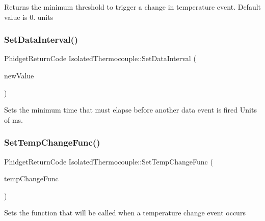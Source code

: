 Returns the minimum threshold to trigger a change in temperature event. Default value is 0. units\mbox{\label{classIsolatedThermocouple_a7d4ff9c47960781140634cb8eeac1258}} 
\subsubsection{\texorpdfstring{Set\+Data\+Interval()}{SetDataInterval()}}
{\footnotesize\ttfamily Phidget\+Return\+Code Isolated\+Thermocouple\+::\+Set\+Data\+Interval (\begin{DoxyParamCaption}\item[{uint32\+\_\+t}]{new\+Value }\end{DoxyParamCaption})\hspace{0.3cm}{\ttfamily [inline]}}

Sets the minimum time that must elapse before another data event is fired Units of ms.\mbox{\label{classIsolatedThermocouple_a1aad9e7c6c473de87a636bff910283c6}} 
\subsubsection{\texorpdfstring{Set\+Temp\+Change\+Func()}{SetTempChangeFunc()}}
{\footnotesize\ttfamily Phidget\+Return\+Code Isolated\+Thermocouple\+::\+Set\+Temp\+Change\+Func (\begin{DoxyParamCaption}\item[{Phidget\+Temperature\+Sensor\+\_\+\+On\+Temperature\+Change\+Callback}]{temp\+Change\+Func }\end{DoxyParamCaption})\hspace{0.3cm}{\ttfamily [inline]}}

Sets the function that will be called when a temperature change event occurs\mbox{\label{classIsolatedThermocouple_acd521a981c7bee54599ce4f9b926a1f8}} 
